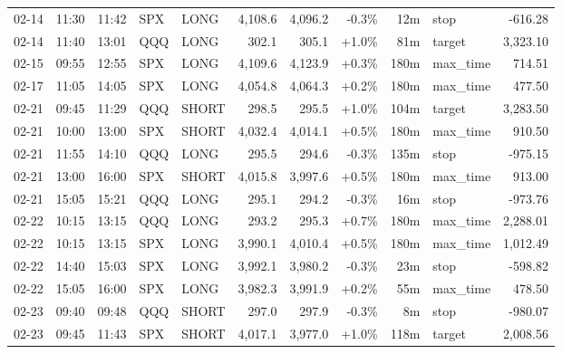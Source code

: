 \documentclass[11pt,a4paper,twoside]{article}
\begin{document}
\begin{center}
\begin{longtable}{>{\color{txtmain}}l l l l l r r r r >{\color{txtmain}}l r}
02-14 & 11:30 & 11:42 & SPX & LONG & 4,108.6 & 4,096.2 & \textcolor{lossred}{-0.3\%} & 12m & stop & \textcolor{lossred}{-616.28} \\
02-14 & 11:40 & 13:01 & QQQ & LONG & 302.1 & 305.1 & \textcolor{wingreen}{+1.0\%} & 81m & target & \textcolor{wingreen}{3,323.10} \\
02-15 & 09:55 & 12:55 & SPX & LONG & 4,109.6 & 4,123.9 & \textcolor{wingreen}{+0.3\%} & 180m & max\_time & \textcolor{wingreen}{714.51} \\
02-17 & 11:05 & 14:05 & SPX & LONG & 4,054.8 & 4,064.3 & \textcolor{wingreen}{+0.2\%} & 180m & max\_time & \textcolor{wingreen}{477.50} \\
02-21 & 09:45 & 11:29 & QQQ & SHORT & 298.5 & 295.5 & \textcolor{wingreen}{+1.0\%} & 104m & target & \textcolor{wingreen}{3,283.50} \\
02-21 & 10:00 & 13:00 & SPX & SHORT & 4,032.4 & 4,014.1 & \textcolor{wingreen}{+0.5\%} & 180m & max\_time & \textcolor{wingreen}{910.50} \\
02-21 & 11:55 & 14:10 & QQQ & LONG & 295.5 & 294.6 & \textcolor{lossred}{-0.3\%} & 135m & stop & \textcolor{lossred}{-975.15} \\
02-21 & 13:00 & 16:00 & SPX & SHORT & 4,015.8 & 3,997.6 & \textcolor{wingreen}{+0.5\%} & 180m & max\_time & \textcolor{wingreen}{913.00} \\
02-21 & 15:05 & 15:21 & QQQ & LONG & 295.1 & 294.2 & \textcolor{lossred}{-0.3\%} & 16m & stop & \textcolor{lossred}{-973.76} \\
02-22 & 10:15 & 13:15 & QQQ & LONG & 293.2 & 295.3 & \textcolor{wingreen}{+0.7\%} & 180m & max\_time & \textcolor{wingreen}{2,288.01} \\
02-22 & 10:15 & 13:15 & SPX & LONG & 3,990.1 & 4,010.4 & \textcolor{wingreen}{+0.5\%} & 180m & max\_time & \textcolor{wingreen}{1,012.49} \\
02-22 & 14:40 & 15:03 & SPX & LONG & 3,992.1 & 3,980.2 & \textcolor{lossred}{-0.3\%} & 23m & stop & \textcolor{lossred}{-598.82} \\
02-22 & 15:05 & 16:00 & SPX & LONG & 3,982.3 & 3,991.9 & \textcolor{wingreen}{+0.2\%} & 55m & max\_time & \textcolor{wingreen}{478.50} \\
02-23 & 09:40 & 09:48 & QQQ & SHORT & 297.0 & 297.9 & \textcolor{lossred}{-0.3\%} & 8m & stop & \textcolor{lossred}{-980.07} \\
02-23 & 09:45 & 11:43 & SPX & SHORT & 4,017.1 & 3,977.0 & \textcolor{wingreen}{+1.0\%} & 118m & target & \textcolor{wingreen}{2,008.56} \\

\end{longtable}
\end{center}
\end{document}
